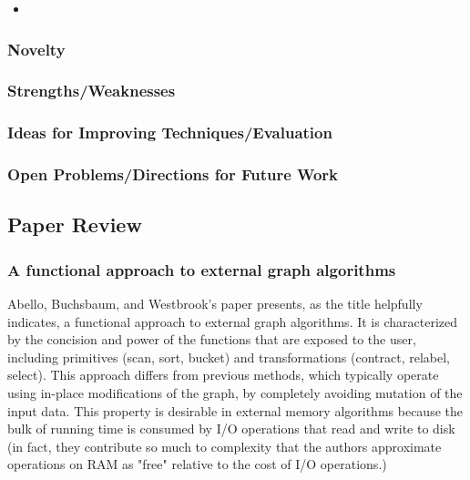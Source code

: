 \begin{itemize}
    \item 
\end{itemize}

\subsubsection{Novelty}


\subsubsection{Strengths/Weaknesses}


\subsubsection{Ideas for Improving Techniques/Evaluation}


\subsubsection{Open Problems/Directions for Future Work}


\newpage

\subsection{Paper Review}
\subsubsection{A functional approach to external graph algorithms}

Abello, Buchsbaum, and Westbrook's paper presents, as the title helpfully indicates, a functional approach to external graph algorithms. It is characterized by the concision and power of the functions that are exposed to the user, including primitives (scan, sort, bucket) and transformations (contract, relabel, select). This approach differs from previous methods, which typically operate using in-place modifications of the graph, by completely avoiding mutation of the input data. This property is desirable in external memory algorithms because the bulk of running time is consumed by I/O operations that read and write to disk (in fact, they contribute so much to complexity that the authors approximate operations on RAM as "free" relative to the cost of I/O operations.)

